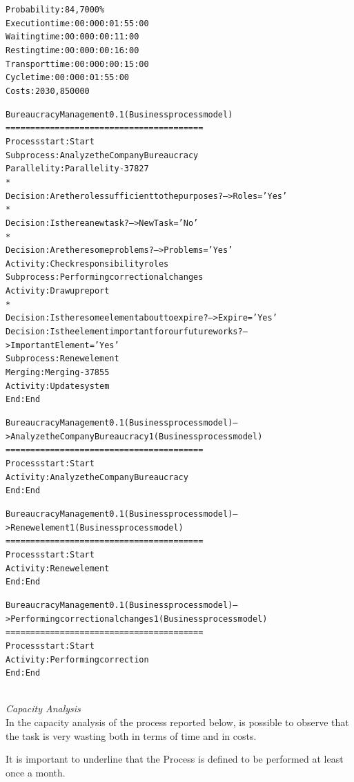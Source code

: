 \begin{alltt}
Probability:   84,7000\%
Execution time:  00:000:01:55:00
Waiting time:  00:000:00:11:00
Resting time:  00:000:00:16:00
Transport time:  00:000:00:15:00
Cycle time:  00:000:01:55:00
Costs:  2030,850000

Bureaucracy Management 0.1 (Business process model)
========================================
Process start: Start
Subprocess: Analyze the Company Bureaucracy
Parallelity: Parallelity-37827
    *
    Decision: Are the roles sufficient to the purposes? --> Roles='Yes'
    *
    Decision: Is there a new task? --> NewTask='No'
    *
    Decision: Are there some problems? --> Problems='Yes'
    Activity: Check responsibility roles
    Subprocess: Performing correctional changes
    Activity: Draw up report
    *
    Decision: Is there some element about to expire? --> Expire='Yes'
    Decision: Is the element important for our future works? --> ImportantElement='Yes'
    Subprocess: Renew element
Merging: Merging-37855
Activity: Update system
End: End

Bureaucracy Management 0.1 (Business process model) --> Analyze the Company Bureaucracy 1 (Business process model)
========================================
Process start: Start
Activity: Analyze the Company Bureaucracy
End: End

Bureaucracy Management 0.1 (Business process model) --> Renew element 1 (Business process model)
========================================
Process start: Start
Activity: Renew element
End: End

Bureaucracy Management 0.1 (Business process model) --> Performing correctional changes 1 (Business process model)
========================================
Process start: Start
Activity: Performing correction
End: End
\end{alltt}\\

\noindent
\emph{Capacity Analysis}\\
In the capacity analysis of the process reported below, is possible to observe that the task is very wasting both in terms of time and in costs.

It is important to underline that the Process is defined to be performed at least once a month.

